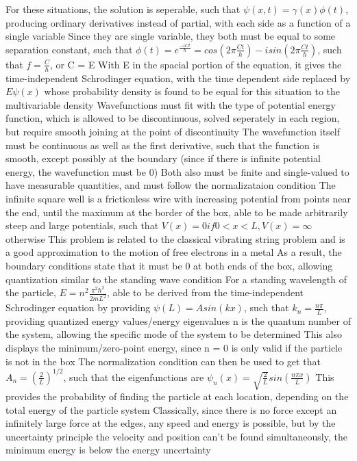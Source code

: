 \documentclass[11 pt, twoside]{article}
\newenvironment{outline*}
{
	\begin{outline}[enumerate]
	}
	{\end{outline}
}
\begin{document}
\begin{outline*}
		\3 For these situations, the solution is seperable, such that $\psi(x, t) = \gamma(x)\phi(t)$, producing ordinary derivatives instead of partial, with each side as a function of a single variable
		\3 Since they are single variable, they both must be equal to some separation constant, such that $\phi(t) = e^{\frac{-iCt}{\hbar}} = cos(2\pi \frac{Ct}{h}) - isin(2\pi \frac{Ct}{h})$, such that $f = \frac{C}{h}$, or C = E
			\4 With E in the spacial portion of the equation, it gives the time-independent Schrodinger equation, with the time dependent side replaced by $E\psi(x)$ whose probability density is found to be equal for this situation to the multivariable density
	\2 Wavefunctions must fit with the type of potential energy function, which is allowed to be discontinuous, solved seperately in each region, but require smooth joining at the point of discontinuity
		\3 The wavefunction itself must be continuous as well as the first derivative, such that the function is smooth, except possibly at the boundary (since if there is infinite potential energy, the wavefunction must be 0)
		\3 Both also must be finite and single-valued to have measurable quantities, and must follow the normalizataion condition
\1 The infinite square well is a frictionless wire with increasing potential from points near the end, until the maximum at the border of the box, able to be made arbitrarily steep and large potentials, such that $V(x) = 0 if 0 < x < L, V(x) = \infty$ otherwise
	\2 This problem is related to the classical vibrating string problem and is a good approximation to the motion of free electrons in a metal
	\2 As a result, the boundary conditions state that it must be 0 at both ends of the box, allowing quantization similar to the standing wave condition
		\3 For a standing wavelength of the particle, $E = n^2\frac{\pi^2\hbar^2}{2mL^2}$, able to be derived from the time-independent Schrodinger equation by providing $\psi(L) = Asin(kx)$, such that $k_n = \frac{n\pi}{L}$, providing quantized energy values/energy eigenvalues
			\4 n is the quantum number of the system, allowing the specific mode of the system to be determined
			\4 This also displays the minimum/zero-point energy, since n = 0 is only valid if the particle is not in the box
		\3 The normalization condition can then be used to get that $A_n = (\frac{2}{L})^{1/2}$, such that the eigenfunctions are $\psi_n(x) = \sqrt{\frac{2}{L}}sin(\frac{n\pi x}{L})$
		\3 This provides the probability of finding the particle at each location, depending on the total energy of the particle system
	\2 Classically, since there is no force except an infinitely large force at the edges, any speed and energy is possible, but by the uncertainty principle the velocity and position can't be found simultaneously, the minimum energy is below the energy uncertainty

\end{outline*}
\end{document}
